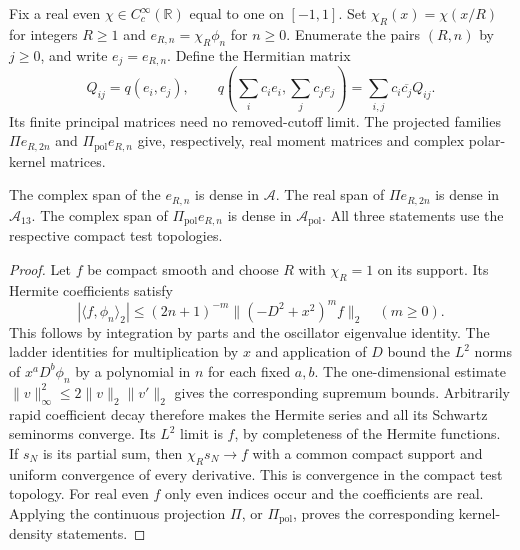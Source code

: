\begin{definition}
\label{v4-arith:w7-h:def:gram}
Fix a real even $\chi\in C_c^\infty(\mathbb R)$ equal to one on
$[-1,1]$. Set $\chi_R(x)=\chi(x/R)$ for integers $R\ge1$ and
$e_{R,n}=\chi_R\phi_n$ for $n\ge0$.
Enumerate the pairs $(R,n)$ by $j\ge0$, and write $e_j=e_{R,n}$.
Define the Hermitian matrix
\begin{equation}
\label{v4-arith:w7-h:eq:gram-definition}
 Q_{ij}=q(e_i,e_j),\qquad
 q\left(\sum_i c_i e_i,\sum_j c_j e_j\right)
       =\sum_{i,j}c_i\overline{c_j}Q_{ij}.
\end{equation}
Its finite principal matrices need no removed-cutoff limit.
The projected families $\Pi e_{R,2n}$ and
$\Pi_{\mathrm{pol}}e_{R,n}$ give, respectively, real moment
matrices and complex polar-kernel matrices.
\end{definition}

\begin{theorem}
\label{v4-arith:consumer78:compact-density}
The complex span of the $e_{R,n}$ is dense in $\mathscr A$.
The real span of $\Pi e_{R,2n}$ is dense in $\mathscr A_{13}$.
The complex span of $\Pi_{\mathrm{pol}}e_{R,n}$ is dense in
$\mathscr A_{\mathrm{pol}}$.
All three statements use the respective compact test topologies.
\end{theorem}
\begin{proof}
Let $f$ be compact smooth and choose $R$ with $\chi_R=1$ on its support.
Its Hermite coefficients satisfy
\[
 |\langle f,\phi_n\rangle_2|
 \le (2n+1)^{-m}\|(-D^2+x^2)^m f\|_2
 \quad(m\ge0).
\]
This follows by integration by parts and the oscillator eigenvalue
identity. The ladder identities for multiplication by $x$ and
application of $D$ bound the $L^2$ norms of
$x^aD^b\phi_n$ by a polynomial in $n$ for each fixed $a,b$.
The one-dimensional estimate
$\|v\|_\infty^2\le2\|v\|_2\|v'\|_2$ gives the corresponding
supremum bounds. Arbitrarily rapid coefficient decay therefore
makes the Hermite series and all its Schwartz seminorms converge.
Its $L^2$ limit is $f$, by completeness of the Hermite functions.
If $s_N$ is its partial sum, then $\chi_Rs_N\to f$ with a common
compact support and uniform convergence of every derivative.
This is convergence in the compact test topology.
For real even $f$ only even indices occur and the coefficients are real.
Applying the continuous projection $\Pi$, or $\Pi_{\mathrm{pol}}$,
proves the corresponding kernel-density statements.
\end{proof}


